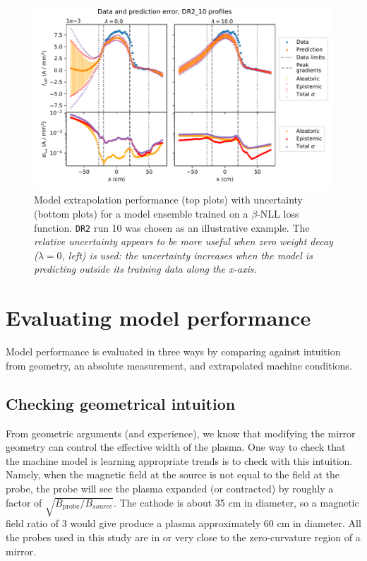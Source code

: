 \begin{figure}
	\centering
	\includegraphics[width=360pt]{figures/extrapolation-profile-variance_DR2_10_wd-comparison_two.pdf}
	\caption[size=12]{\label{fig:extrapolation-profile-var_two}Model extrapolation performance (top plots) with uncertainty (bottom plots) for a model ensemble trained on a $\beta$-NLL loss function. \texttt{DR2} run 10 was chosen as an illustrative example. The \em relative \em uncertainty appears to be more useful when zero weight decay ($\lambda = 0$, left) is used: the uncertainty increases when the model is predicting outside its training data along the x-axis.}
\end{figure}

\section{Evaluating model performance}
\label{sec:validation}

Model performance is evaluated in three ways by comparing against intuition from geometry, an absolute measurement, and extrapolated machine conditions. 


\subsection{Checking geometrical intuition}

From geometric arguments (and experience), we know that modifying the mirror geometry can control the effective width of the plasma. One way to check that the machine model is learning appropriate trends is to check with this intuition. Namely, when the magnetic field at the source is not equal to the field at the probe, the probe will see the plasma expanded (or contracted) by roughly a factor of $\sqrt{B_\text{probe}/B_{source}}$. The cathode is about 35 cm in diameter, so a magnetic field ratio of 3 would give produce a plasma approximately 60 cm in diameter. All the probes used in this study are in or very close to the zero-curvature region of a mirror.

